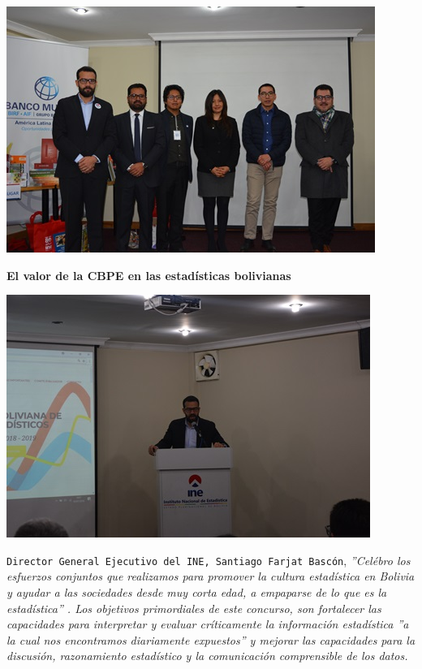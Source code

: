 \documentclass[8pt,a4paper]{article} %
\newcommand{\NewsItem}[1]{ %
\usefont{T1}{fvs}{n}{n} %
\vspace{24pt}\large #1\vspace{3pt} %
\par \normalsize \normalfont}
\begin{document}
\begin{multicols}{2}
\begin{center}
\includegraphics[scale=0.13]{foto2.jpg} %
\end{center}

\NewsItem{\textbf{El valor de la  CBPE en las estadísticas bolivianas}}

\vspace{0.2cm}

\begin{center}
\includegraphics[scale=0.15]{foto3.jpg} %
\end{center}

\vspace{0.2cm}

{\tt Director General Ejecutivo del INE, Santiago Farjat Bascón}, \textit{''Celébro los esfuerzos conjuntos que realizamos para promover la cultura estadística en Bolivia y ayudar a las sociedades desde muy corta edad, a empaparse de lo que es la estadística'' . Los objetivos primordiales de este 
concurso, son fortalecer las capacidades para interpretar y evaluar críticamente la información estadística ''a la 
cual nos encontramos diariamente expuestos'' y mejorar las capacidades para la discusión, razonamiento estadístico y 
la comunicación comprensible de los datos.}\\


\end{multicols}
\end{document}
